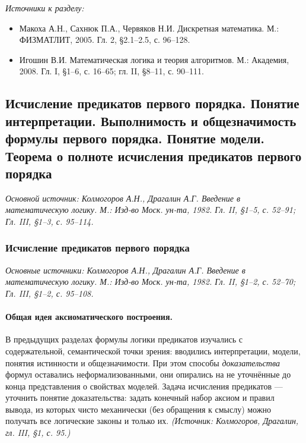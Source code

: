 \documentclass[a4paper,12pt]{article}
\begin{document}
\noindent\textit{Источники к разделу:}
\begin{itemize}
\item Макоха А.Н., Сахнюк П.А., Червяков Н.И. Дискретная математика. М.: ФИЗМАТЛИТ, 2005. Гл. 2, §2.1--2.5, с. 96--128.
\item Игошин В.И. Математическая логика и теория алгоритмов. М.: Академия, 2008. Гл. I, §1--6, с. 16--65; гл. II, §8--11, с. 90--111.
\end{itemize}

\subsection{Исчисление предикатов первого порядка. Понятие интерпретации. Выполнимость и общезначимость формулы первого порядка. Понятие модели. Теорема о полноте исчисления предикатов первого порядка}

\noindent\textit{Основной источник: Колмогоров А.Н., Драгалин А.Г. Введение в математическую логику. М.: Изд-во Моск. ун-та, 1982. Гл. II, §1--5, с. 52--91; Гл. III, §1--3, с. 95--114.}

\subsubsection{Исчисление предикатов первого порядка}

\noindent\textit{Основные источники: Колмогоров А.Н., Драгалин А.Г. Введение в математическую логику. М.: Изд-во Моск. ун-та, 1982. Гл. II, §1--2, с. 52--70; Гл. III, §1--2, с. 95--108.}

\paragraph{Общая идея аксиоматического построения.} В предыдущих разделах формулы логики предикатов изучались с содержательной, семантической точки зрения: вводились интерпретации, модели, понятия истинности и общезначимости. При этом способы \emph{доказательства} формул оставались неформализованными, они опирались на не уточнённые до конца представления о свойствах моделей. Задача исчисления предикатов — уточнить понятие доказательства: задать конечный набор аксиом и правил вывода, из которых чисто механически (без обращения к смыслу) можно получать все логические законы и только их.
\textit{(Источник: Колмогоров, Драгалин, гл. III, §1, с. 95.)}
\end{document}
